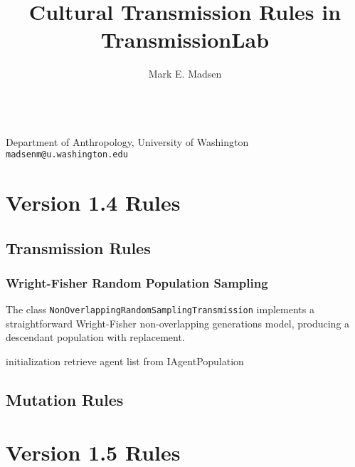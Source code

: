 \documentclass{article}
\begin{document}
\title{Cultural Transmission Rules in TransmissionLab} 
\maketitle


\author{Mark E. Madsen}\\
Department of Anthropology, University of Washington\\
\texttt{madsenm@u.washington.edu}


\section{Version 1.4 Rules}
\subsection{Transmission Rules}
\subsubsection{Wright-Fisher Random Population Sampling}
The class \texttt{NonOverlappingRandomSamplingTransmission} implements a straightforward Wright-Fisher non-overlapping generations model, producing a descendant population with replacement.  

\begin{algorithm}[H]
\SetLine
{}
initialization\;
retrieve agent list from IAgentPopulation\;

\end{algorithm}

\subsection{Mutation Rules}


\section{Version 1.5 Rules}
\end{document}
